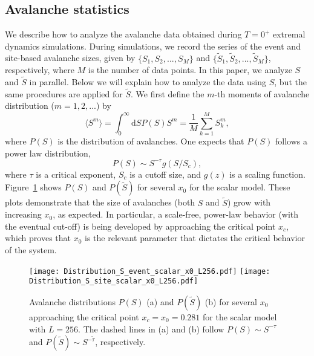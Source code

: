 \documentclass[pre,twocolumn,superscriptaddress,tightenlines,showpacs,longbibliography,floatfix,footinbib]{revtex4-1}
\begin{document}
\subsection{Avalanche statistics}

We describe how to analyze the avalanche data obtained during $T=0^+$ extremal dynamics simulations.
During simulations, we record the series of the event and site-based avalanche sizes, given by $\{ S_1, S_2, ..., S_M\}$ and $\{ \tilde S_1, \tilde S_2, ..., \tilde S_M\}$, respectively, where $M$ is the number of data points.
In this paper, we analyze $S$ and $\tilde S$ in parallel. Below we will explain how to analyze the data using $S$, but the same procedures are applied for $\tilde S$.
We first define the $m$-th moments of avalanche distribution ($m=1, 2, ...$) by
\begin{equation}
    \langle S^m \rangle = \int_0^{\infty} \mathrm{d} S P(S) S^m = \frac{1}{M} \sum_{k=1}^M S_k^m,
\end{equation}
where $P(S)$ is the distribution of avalanches.
One expects that $P(S)$ follows a power law distribution,
\begin{equation}
    P(S) \sim S^{-\tau} g(S/S_c),
    \label{eq:power_law}
\end{equation}
where $\tau$ is a critical exponent, $S_c$ is a cutoff size, and $g(z)$ is a scaling function.
Figure~\ref{fig:P_of_S_x0} shows $P(S)$ and $P(\tilde S)$ for several $x_0$ for the scalar model. 
These plots demonstrate that the size of avalanches (both $S$ and $\tilde S$) grow with increasing $x_0$, as expected. In particular, a scale-free, power-law behavior (with the eventual cut-off) is being developed by approaching the critical point $x_c$, which proves that $x_0$ is the relevant parameter that dictates the critical behavior of the system.

\begin{figure}
\centering
\texttt{[image: Distribution\_S\_event\_scalar\_x0\_L256.pdf]}
\texttt{[image: Distribution\_S\_site\_scalar\_x0\_L256.pdf]}
\caption{
Avalanche distributions $P(S)$ (a) and $P(\tilde S)$ (b) for several $x_0$ approaching the critical point $x_c=x_0=0.281$ for the scalar model with $L=256$. The dashed lines in (a) and (b) follow $P(S) \sim S^{-\tau}$ and  $P(\tilde S) \sim S^{-\tilde \tau}$, respectively.
}
\label{fig:P_of_S_x0}
\end{figure}
\end{document}
